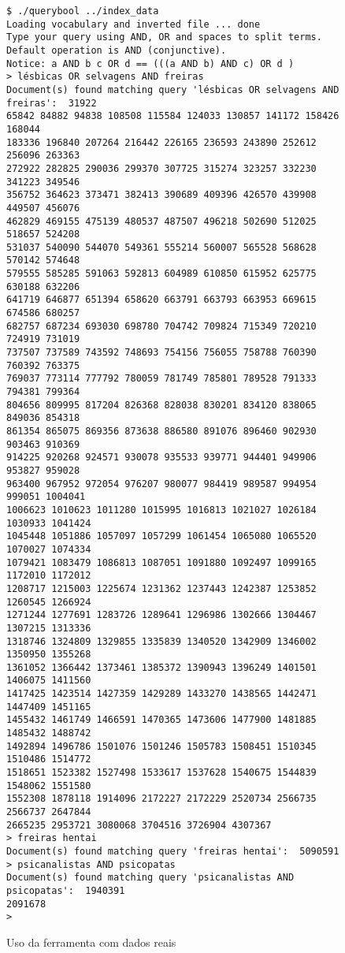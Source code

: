 \documentclass[10pt,twocolumn]{article}
\begin{document}
\begin{figure*}
\begin{center}
\begin{verbatim}
$ ./querybool ../index_data
Loading vocabulary and inverted file ... done
Type your query using AND, OR and spaces to split terms.
Default operation is AND (conjunctive).
Notice: a AND b c OR d == (((a AND b) AND c) OR d )
> lésbicas OR selvagens AND freiras
Document(s) found matching query 'lésbicas OR selvagens AND freiras':  31922
65842 84882 94838 108508 115584 124033 130857 141172 158426 168044
183336 196840 207264 216442 226165 236593 243890 252612 256096 263363
272922 282825 290036 299370 307725 315274 323257 332230 341223 349546
356752 364623 373471 382413 390689 409396 426570 439908 449507 456076
462829 469155 475139 480537 487507 496218 502690 512025 518657 524208
531037 540090 544070 549361 555214 560007 565528 568628 570142 574648
579555 585285 591063 592813 604989 610850 615952 625775 630188 632206
641719 646877 651394 658620 663791 663793 663953 669615 674586 680257
682757 687234 693030 698780 704742 709824 715349 720210 724919 731019
737507 737589 743592 748693 754156 756055 758788 760390 760392 763375
769037 773114 777792 780059 781749 785801 789528 791333 794381 799364
804656 809995 817204 826368 828038 830201 834120 838065 849036 854318
861354 865075 869356 873638 886580 891076 896460 902930 903463 910369
914225 920268 924571 930078 935533 939771 944401 949906 953827 959028
963400 967952 972054 976207 980077 984419 989587 994954 999051 1004041
1006623 1010623 1011280 1015995 1016813 1021027 1026184 1030933 1041424
1045448 1051886 1057097 1057299 1061454 1065080 1065520 1070027 1074334
1079421 1083479 1086813 1087051 1091880 1092497 1099165 1172010 1172012
1208717 1215003 1225674 1231362 1237443 1242387 1253852 1260545 1266924
1271244 1277691 1283726 1289641 1296986 1302666 1304467 1307215 1313336
1318746 1324809 1329855 1335839 1340520 1342909 1346002 1350950 1355268
1361052 1366442 1373461 1385372 1390943 1396249 1401501 1406075 1411560
1417425 1423514 1427359 1429289 1433270 1438565 1442471 1447409 1451165
1455432 1461749 1466591 1470365 1473606 1477900 1481885 1485432 1488742
1492894 1496786 1501076 1501246 1505783 1508451 1510345 1510486 1514772
1518651 1523382 1527498 1533617 1537628 1540675 1544839 1548062 1551580
1552308 1878118 1914096 2172227 2172229 2520734 2566735 2566737 2647844
2665235 2953721 3080068 3704516 3726904 4307367
> freiras hentai
Document(s) found matching query 'freiras hentai':  5090591
> psicanalistas AND psicopatas
Document(s) found matching query 'psicanalistas AND psicopatas':  1940391
2091678
>
\end{verbatim}
\caption{Uso da ferramenta com dados reais}
\label{fig:real}
\end{center}
\end{figure*}
\end{document}
